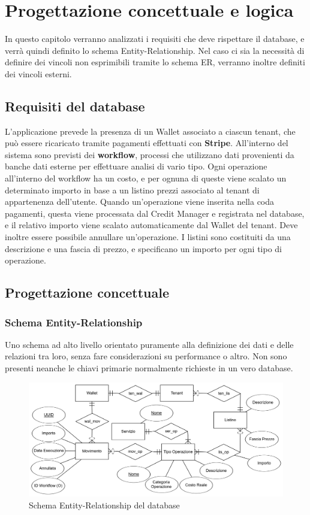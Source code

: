 \chapter{Progettazione concettuale e logica}
In questo capitolo verranno analizzati i requisiti che deve rispettare il database, e verr\`a quindi definito lo schema Entity-Relationship. Nel caso ci sia la necessit\`a
di definire dei vincoli non esprimibili tramite lo schema ER, verranno inoltre definiti dei vincoli esterni.
\section{Requisiti del database}
L'applicazione prevede la presenza di un Wallet associato a ciascun tenant, che pu\`o essere ricaricato tramite pagamenti effettuati con \textbf{Stripe}.
All'interno del sistema sono previsti dei \textbf{workflow}, processi che utilizzano dati provenienti da banche dati esterne per effettuare analisi di vario tipo.
Ogni operazione all'interno del workflow ha un costo, e per ognuna di queste viene scalato un determinato importo in base a un listino prezzi associato al tenant di appartenenza dell'utente.
Quando un'operazione viene inserita nella coda pagamenti, questa viene processata dal Credit Manager e registrata nel database, e il relativo importo viene scalato automaticamente dal Wallet del tenant.
Deve inoltre essere possibile annullare un'operazione. I listini sono costituiti da una descrizione e una fascia di prezzo, e specificano un importo per ogni tipo di operazione.

\section{Progettazione concettuale}
\subsection{Schema Entity-Relationship}
Uno schema ad alto livello orientato puramente alla definizione dei dati e delle relazioni tra loro, senza fare considerazioni su performance o altro.
Non sono presenti neanche le chiavi primarie normalmente richieste in un vero database.
\begin{figure}[H]
  \centering
  \includegraphics[width=14cm]{images/db-diagrams/er-diagram-concept.png}
  \caption{Schema Entity-Relationship del database}
\end{figure}

